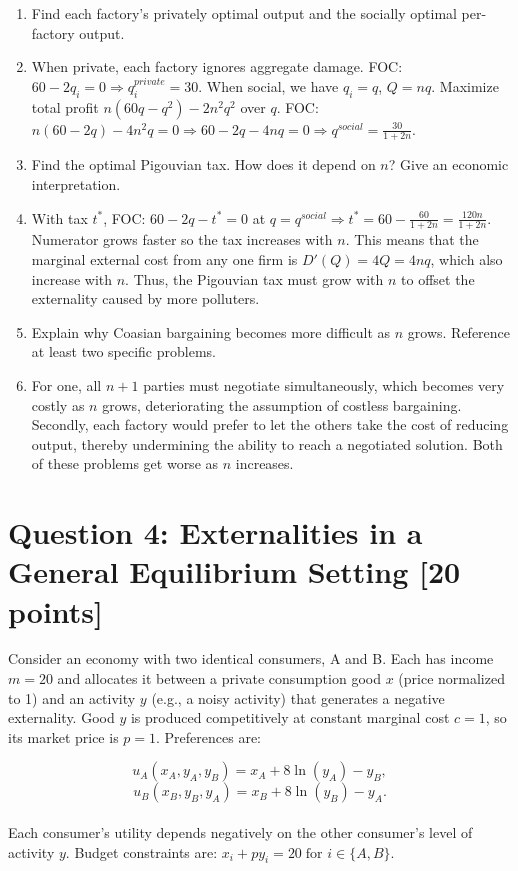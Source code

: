 \documentclass[11pt]{article}
\begin{document}
\begin{enumerate}[label=(\alph*)]
\begin{enumerate}[label=(\roman*)]
\item Find each factory's privately optimal output and the socially optimal per-factory output.
\item[] When private, each factory ignores aggregate damage. FOC: $60-2q_i=0\Rightarrow q_i^{private}=30$. When social, we have $q_i=q$, $Q=nq$. Maximize total profit $n(60q-q^2)-2n^2q^2$ over $q$. FOC: $n(60-2q)-4n^2q=0\Rightarrow60-2q-4nq=0\Rightarrow q^{social}=\frac{30}{1+2n}$.
\item Find the optimal Pigouvian tax. How does it depend on $n$? Give an economic interpretation.
\item[] With tax $t^*$, FOC: $60-2q-t^*=0$ at $q=q^{social}\Rightarrow t^*=60-\frac{60}{1+2n}=\frac{120n}{1+2n}$. Numerator grows faster so the tax increases with $n$. This means that the marginal external cost from any one firm is $D'(Q)=4Q=4nq$, which also increase with $n$. Thus, the Pigouvian tax must grow with $n$ to offset the externality caused by more polluters.
\item Explain why Coasian bargaining becomes more difficult as $n$ grows. Reference at least two specific problems.
\item[] For one, all $n+1$ parties must negotiate simultaneously, which becomes very costly as $n$ grows, deteriorating the assumption of costless bargaining. Secondly, each factory would prefer to let the others take the cost of reducing output, thereby undermining the ability to reach a negotiated solution. Both of these problems get worse as $n$ increases.
\end{enumerate}

\end{enumerate}

\bigskip

\section*{Question 4: Externalities in a General Equilibrium Setting [20 points]}

Consider an economy with two identical consumers, A and B. Each has income $m = 20$ and allocates it between a private consumption good $x$ (price normalized to 1) and an activity $y$ (e.g., a noisy activity) that generates a negative externality. Good $y$ is produced competitively at constant marginal cost $c = 1$, so its market price is $p = 1$. Preferences are:

\[
u_A(x_A, y_A, y_B) = x_A + 8 \ln(y_A) - y_B,
\]
\[
u_B(x_B, y_B, y_A) = x_B + 8 \ln(y_B) - y_A.
\] \\
Each consumer's utility depends negatively on the other consumer's level of activity $y$. Budget constraints are: $x_i + p y_i = 20 \; \text{for } i \in \{A,B\}$.
\end{document}

